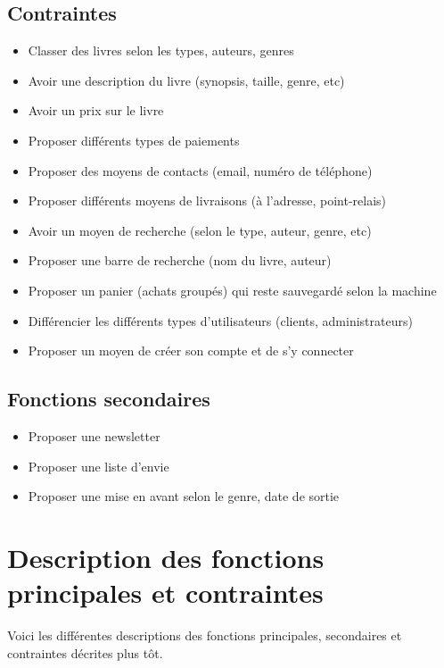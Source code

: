 \documentclass[14pt]{extarticle}
\begin{document}
\subsection{Contraintes}
\begin{itemize}
    \item Classer des livres selon les types, auteurs, genres
    \item Avoir une description du livre (synopsis, taille, genre, etc)
    \item Avoir un prix sur le livre
    \item Proposer différents types de paiements
    \item Proposer des moyens de contacts (email, numéro de téléphone)
    \item Proposer différents moyens de livraisons (à l'adresse, point-relais)
    \item Avoir un moyen de recherche (selon le type, auteur, genre, etc)
    \item Proposer une barre de recherche (nom du livre, auteur)
    \item Proposer un panier (achats groupés) qui reste sauvegardé selon la machine
    \item Différencier les  différents types d'utilisateurs (clients, administrateurs)
    \item Proposer un moyen de créer son compte et de s'y connecter
\end{itemize}

\subsection{Fonctions secondaires}
\begin{itemize}
    \item Proposer une newsletter
    \item Proposer une liste d'envie
    \item Proposer une mise en avant selon le genre, date de sortie
\end{itemize}

\section{Description des fonctions principales et contraintes}
Voici les différentes descriptions des fonctions principales, secondaires et contraintes décrites plus tôt.
\end{document}
